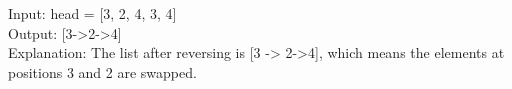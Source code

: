 \documentclass[preview]{standalone}
\begin{document}
Input: head = [3, 2, 4, 3, 4]\\Output: [3->2->4]\\Explanation: The list after reversing is [3 -> 2->4], which means the elements at positions 3 and 2 are swapped.\\
\end{document}
